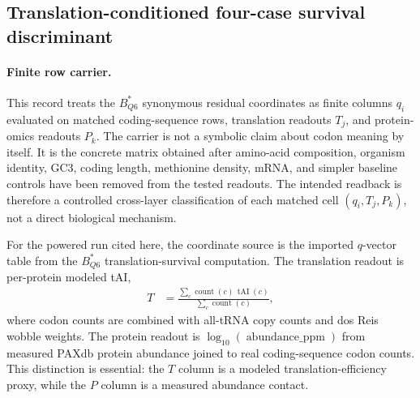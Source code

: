 \subsection{Translation-conditioned four-case survival discriminant}
\label{sec:q6-translation-conditioned-four-case-survival-discriminant-cross-layer}

\paragraph{Finite row carrier.}
This record treats the $B^*_{Q6}$ synonymous residual coordinates as finite columns $q_i$ evaluated on matched coding-sequence rows, translation readouts $T_j$, and protein-omics readouts $P_k$. The carrier is not a symbolic claim about codon meaning by itself. It is the concrete matrix obtained after amino-acid composition, organism identity, GC3, coding length, methionine density, mRNA, and simpler baseline controls have been removed from the tested readouts. The intended readback is therefore a controlled cross-layer classification of each matched cell $(q_i,T_j,P_k)$, not a direct biological mechanism.

For the powered run cited here, the coordinate source is the imported $q$-vector table from the $B^*_{Q6}$ translation-survival computation. The translation readout is per-protein modeled tAI,
$$
\begin{aligned}
T &= \frac{\sum_{c} \operatorname{count}(c)\,\operatorname{tAI}(c)}{\sum_{c} \operatorname{count}(c)},
\end{aligned}
$$
where codon counts are combined with all-tRNA copy counts and dos Reis wobble weights. The protein readout is $\log_{10}(\operatorname{abundance\_ppm})$ from measured PAXdb protein abundance joined to real coding-sequence codon counts. This distinction is essential: the $T$ column is a modeled translation-efficiency proxy, while the $P$ column is a measured abundance contact.

